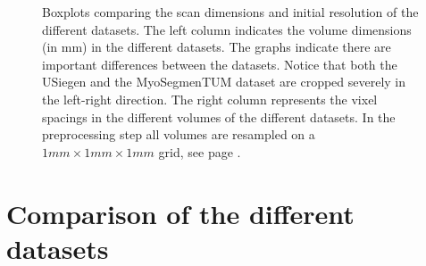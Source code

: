 \begin{figure}
\begin{minipage}{0.45\textwidth}
    \end{minipage}
    \caption{Boxplots comparing the scan dimensions and initial resolution of the different datasets.
    The left column indicates the volume dimensions (in mm) in the different datasets. 
    The graphs indicate there are important differences between the datasets. Notice that both the USiegen and the MyoSegmenTUM dataset are cropped severely in the left-right direction.
    The right column represents the vixel spacings in the different volumes of the different datasets.
    In the preprocessing step all volumes are resampled on a $1mm \times 1mm \times 1mm$ grid, see page \pageref{sec:resampling}. \label{fig:AllDataset_dims} }
    
\end{figure}
\FloatBarrier
\section{Comparison of the different datasets\label{seg:datasetcomparison}}

\FloatBarrier

\FloatBarrier

\FloatBarrier

\FloatBarrier


